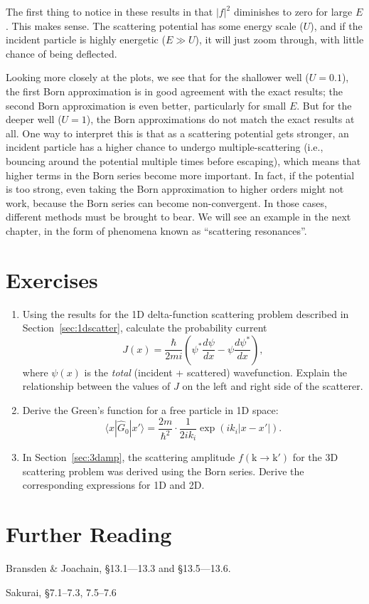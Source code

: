 \documentclass[pra,12pt]{revtex4}
\begin{document}
The first thing to notice in these results in that $|f|^2$ diminishes
to zero for large $E$.  This makes sense.  The scattering potential
has some energy scale ($U$), and if the incident particle is highly
energetic ($E \gg U$), it will just zoom through, with little chance
of being deflected.

Looking more closely at the plots, we see that for the shallower well
($U = 0.1$), the first Born approximation is in good agreement with
the exact results; the second Born approximation is even better,
particularly for small $E$.  But for the deeper well ($U = 1$), the
Born approximations do not match the exact results at all.  One way to
interpret this is that as a scattering potential gets stronger, an
incident particle has a higher chance to undergo multiple-scattering
(i.e., bouncing around the potential multiple times before escaping),
which means that higher terms in the Born series become more
important.  In fact, if the potential is too strong, even taking the
Born approximation to higher orders might not work, because the Born
series can become non-convergent.  In those cases, different methods
must be brought to bear.  We will see an example in the next chapter,
in the form of phenomena known as ``scattering resonances''.

\section*{Exercises}

\begin{enumerate}
\item Using the results for the 1D delta-function scattering problem
  described in Section~\ref{sec:1dscatter}, calculate the probability
  current
  \begin{equation}
    J(x) = \frac{\hbar}{2mi}\left(\psi^*\frac{d\psi}{dx} - \psi\frac{d\psi^*}{dx}\right),
  \end{equation}
  where $\psi(x)$ is the \textit{total} (incident + scattered)
  wavefunction.  Explain the relationship between the values of $J$ on
  the left and right side of the scatterer.

\item Derive the Green's function for a free particle in 1D space:
  \begin{equation}
    \langle x|\hat{G}_0|x'\rangle = \frac{2m}{\hbar^2} \cdot \frac{1}{2ik_i} \exp\left(ik_i|x-x'|\right).
  \end{equation}

\item In Section~\ref{sec:3damp}, the scattering amplitude
  $f(\mathrm{k}\rightarrow\mathrm{k}')$ for the 3D scattering problem
  was derived using the Born series.  Derive the corresponding
  expressions for 1D and 2D.
\end{enumerate}


\section*{Further Reading}

\begin{enumerate}[[1{]}]
\item Bransden \& Joachain, \S13.1---13.3 and \S13.5---13.6.
\item Sakurai, \S7.1--7.3, 7.5--7.6
\end{enumerate}
\end{document}

